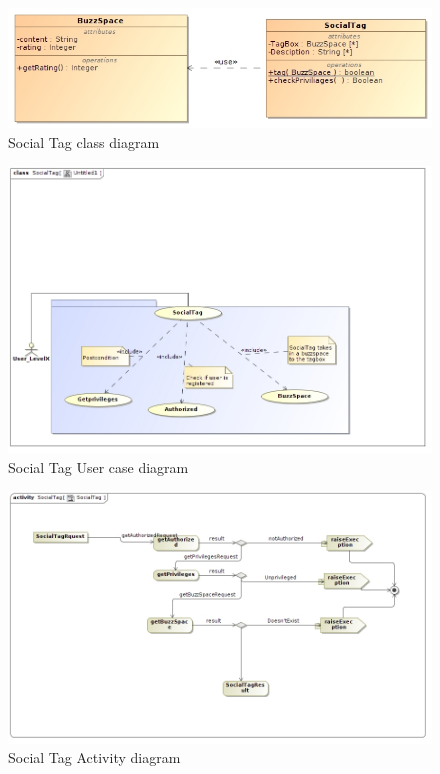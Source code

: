 \documentclass[11pt]{article}
\begin{document}
\begin{enumerate}
\begin{figure}[H]	
\graphicspath{ {../Diagrams/sfiso/} }
    	\includegraphics[scale=0.5]{socialC.jpg}
    	\caption{Social Tag class  diagram}
	\end{figure}
	\begin{figure}[H]	
\graphicspath{ {../Diagrams/sfiso/} }
    	\includegraphics[scale=0.5]{socialtag.jpg}
    	\caption{Social Tag User case diagram}
	\end{figure}

\begin{figure}[H]	
\graphicspath{ {../Diagrams/sfiso/} }
    	\includegraphics[scale=0.5]{socialA.jpg}
    	\caption{Social Tag Activity  diagram}
	\end{figure}


\end{enumerate}
\end{document}
